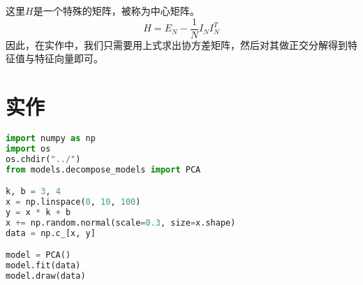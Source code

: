 \documentclass{report}
\begin{document}
这里$H$是一个特殊的矩阵，被称为中心矩阵。
$$
H=E_N - \frac{1}{N}I_N I_N^T
$$
因此，在实作中，我们只需要用上式求出协方差矩阵，然后对其做正交分解得到特征值与特征向量即可。
\newpage
\section{实作}
\begin{lstlisting}[language={python}]
import numpy as np
import os
os.chdir("../")
from models.decompose_models import PCA

k, b = 3, 4
x = np.linspace(0, 10, 100)
y = x * k + b
x += np.random.normal(scale=0.3, size=x.shape)
data = np.c_[x, y]

model = PCA()
model.fit(data)
model.draw(data)
\end{lstlisting}
\end{document}
